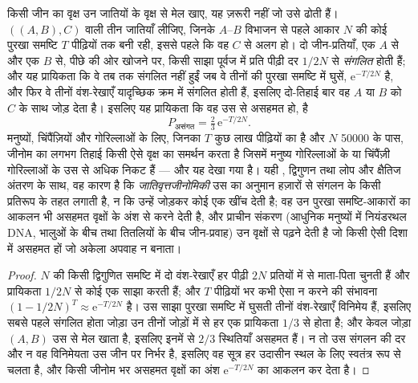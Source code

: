 \begin{proposition}[अपूर्ण वंश-छँटाई]\label{prop:b3:molecular-evolution:ils}
किसी जीन का वृक्ष उन जातियों के वृक्ष से मेल खाए, यह ज़रूरी नहीं जो उसे
ढोती हैं।  $((A,B),C)$ वाली तीन जातियाँ लीजिए, जिनके
$A$--$B$ विभाजन से पहले आकार $N$ की कोई पुरखा समष्टि $T$ पीढ़ियों तक
बनी रही, इससे पहले कि वह $C$ से अलग हो। दो जीन-प्रतियाँ, एक $A$ से और एक $B$ से,
पीछे की ओर खोजने पर, किसी साझा पूर्वज में प्रति पीढ़ी दर $1/2N$ से
\emph{संगलित} होती हैं; और यह प्रायिकता कि वे तब तक संगलित नहीं हुईं जब
वे तीनों की पुरखा समष्टि में घुसें, $\mathrm{e}^{-T/2N}$ है, और फिर वे
तीनों वंश-रेखाएँ यादृच्छिक क्रम में संगलित होती हैं, इसलिए दो-तिहाई बार
वह  $A$ या $B$ को $C$ के साथ जोड़ देता है। इसलिए यह प्रायिकता
कि वह  उस  से असहमत हो, है
\[
P_{\text{असंगत}} = \tfrac{2}{3}\,\mathrm{e}^{-T/2N} .
\]
मनुष्यों, चिंपैंज़ियों और गोरिल्लाओं के लिए, जिनका $T$ कुछ लाख पीढ़ियों
का है और $N$ \num{50000} के पास, जीनोम का लगभग तिहाई किसी ऐसे वृक्ष का
समर्थन करता है जिसमें मनुष्य गोरिल्लाओं के या चिंपैंज़ी गोरिल्लाओं के
उस  से अधिक निकट हैं --- और यह देखा गया है। यही
\emph{}, द्विगुणन तथा लोप और क्षैतिज अंतरण के साथ, वह
कारण है कि \emph{जातिवृत्तजीनोमिकी} उस  का अनुमान हज़ारों
 से संगलन के किसी प्रतिरूप के तहत लगाती है, न कि उन्हें जोड़कर
कोई एक खींच देती है; वह उन पुरखा समष्टि-आकारों का आकलन भी असहमत वृक्षों
के अंश से करने देती है, और प्राचीन संकरण (आधुनिक मनुष्यों में
नियंडरथल DNA, भालुओं के बीच तथा तितलियों के बीच जीन-प्रवाह) उन वृक्षों
से पढ़ने देती है जो किसी ऐसी दिशा में असहमत हों जो अकेला अपवाह न बनाता।
\end{proposition}
\begin{proof}
$N$ की किसी द्विगुणित समष्टि में दो वंश-रेखाएँ हर पीढ़ी $2N$ प्रतियों
में से माता-पिता चुनती हैं और प्रायिकता $1/2N$ से कोई एक साझा करती हैं;
और $T$ पीढ़ियों भर कभी ऐसा न करने की संभावना $(1 - 1/2N)^{T} \approx
\mathrm{e}^{-T/2N}$ है। उस साझा पुरखा समष्टि में घुसती तीनों
वंश-रेखाएँ विनिमेय हैं, इसलिए सबसे पहले संगलित होता जोड़ा उन तीनों
जोड़ों में से हर एक प्रायिकता $1/3$ से होता है; और केवल जोड़ा $(A,B)$
उस  से मेल खाता है, इसलिए इनमें से $2/3$ स्थितियाँ असहमत हैं।
न तो उस संगलन की दर और न वह विनिमेयता उस जीन पर निर्भर है, इसलिए वह
सूत्र हर उदासीन स्थल के लिए स्वतंत्र रूप से चलता है, और किसी जीनोम भर
असहमत वृक्षों का अंश $\mathrm{e}^{-T/2N}$ का आकलन कर देता है।
\end{proof}

